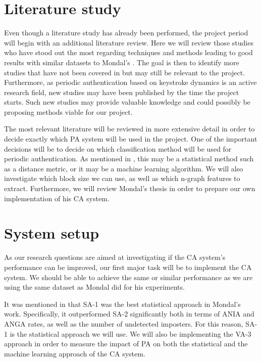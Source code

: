 \documentclass[informationsecurity]{gucmasterproject}
\begin{document}
\section{Literature study}
Even though a literature study has already been performed, the project period will begin with an additional literature review.
Here we will review those studies who have stood out the most regarding techniques and methods leading to good results with similar datasets to Mondal's \cite{mondal}.
The goal is then to identify more studies that have not been covered in  but may still be relevant to the project.
Furthermore, as periodic authentication based on keystroke dynamics is an active research field, new studies may have been published by the time the project starts.
Such new studies may provide valuable knowledge and could possibly be proposing methods viable for our project.

The most relevant literature will be reviewed in more extensive detail in order to decide exactly which PA system will be used in the project.
One of the important decisions will be to decide on which classification method will be used for periodic authentication.
As mentioned in , this may be a statistical method such as a distance metric, or it may be a machine learning algorithm.
We will also investigate which block size we can use, as well as which n-graph features to extract.
Furthermore, we will review Mondal's \cite{mondal} thesis in order to prepare our own implementation of his CA system.

\section{System setup}
As our research questions are aimed at investigating if the CA system's performance can be improved, our first major task will be to implement the CA system.
We should be able to achieve the same or similar performance as we are using the same dataset as Mondal \cite{mondal} did for his experiments.

It was mentioned in  that SA-1 was the best statistical approach in Mondal's work.
Specifically, it outperformed SA-2 significantly both in terms of ANIA and ANGA rates, as well as the number of undetected imposters.
For this reason, SA-1 is the statistical approach we will use.
We will also be implementing the VA-3 approach in order to measure the impact of PA on both the statistical and the machine learning approach of the CA system.
\end{document}
